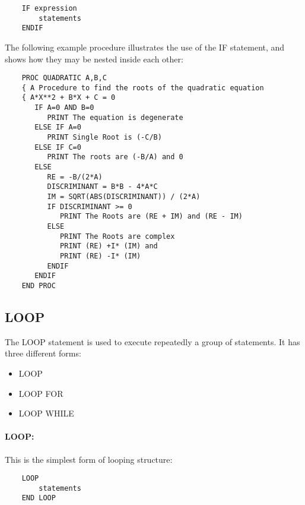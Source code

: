 \begin{small}
\begin{verbatim}
    IF expression
        statements
    ENDIF
\end{verbatim}
\end{small}

The following example procedure illustrates the use of the IF statement, and
shows how they may be nested inside each other:

\begin{small}
\begin{verbatim}
    PROC QUADRATIC A,B,C
    { A Procedure to find the roots of the quadratic equation
    { A*X**2 + B*X + C = 0
       IF A=0 AND B=0
          PRINT The equation is degenerate
       ELSE IF A=0
          PRINT Single Root is (-C/B)
       ELSE IF C=0
          PRINT The roots are (-B/A) and 0
       ELSE
          RE = -B/(2*A)
          DISCRIMINANT = B*B - 4*A*C
          IM = SQRT(ABS(DISCRIMINANT)) / (2*A)
          IF DISCRIMINANT >= 0
             PRINT The Roots are (RE + IM) and (RE - IM)
          ELSE
             PRINT The Roots are complex
             PRINT (RE) +I* (IM) and
             PRINT (RE) -I* (IM)
          ENDIF
       ENDIF
    END PROC
\end{verbatim}
\end{small}


\subsection{LOOP}

The LOOP statement is used to execute repeatedly a group of statements.
It has three different forms:
\begin{itemize}
\item LOOP
\item LOOP FOR
\item LOOP WHILE
\end{itemize}

\paragraph{LOOP:}\hfill

This is the simplest form of looping structure:

\begin{small}
\begin{verbatim}
    LOOP
        statements
    END LOOP
\end{verbatim}
\end{small}

